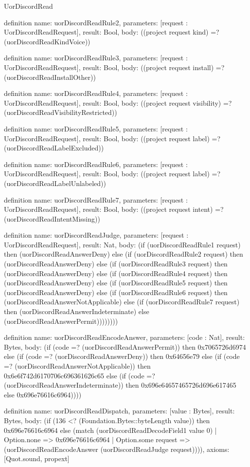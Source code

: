\begin{lexlean}{UorDiscordRead}
\begin{semanticmodule}
definition{
  name: uorDiscordReadRule2,
  parameters: [request : UorDiscordReadRequest],
  result: Bool,
  body: ((project request kind) =? (uorDiscordReadKindVoice))
}

definition{
  name: uorDiscordReadRule3,
  parameters: [request : UorDiscordReadRequest],
  result: Bool,
  body: ((project request install) =? (uorDiscordReadInstallOther))
}

definition{
  name: uorDiscordReadRule4,
  parameters: [request : UorDiscordReadRequest],
  result: Bool,
  body: ((project request visibility) =? (uorDiscordReadVisibilityRestricted))
}

definition{
  name: uorDiscordReadRule5,
  parameters: [request : UorDiscordReadRequest],
  result: Bool,
  body: ((project request label) =? (uorDiscordReadLabelExcluded))
}

definition{
  name: uorDiscordReadRule6,
  parameters: [request : UorDiscordReadRequest],
  result: Bool,
  body: ((project request label) =? (uorDiscordReadLabelUnlabeled))
}

definition{
  name: uorDiscordReadRule7,
  parameters: [request : UorDiscordReadRequest],
  result: Bool,
  body: ((project request intent) =? (uorDiscordReadIntentMissing))
}

definition{
  name: uorDiscordReadJudge,
  parameters: [request : UorDiscordReadRequest],
  result: Nat,
  body: (if (uorDiscordReadRule1 request) then (uorDiscordReadAnswerDeny) else (if (uorDiscordReadRule2 request) then (uorDiscordReadAnswerDeny) else (if (uorDiscordReadRule3 request) then (uorDiscordReadAnswerDeny) else (if (uorDiscordReadRule4 request) then (uorDiscordReadAnswerDeny) else (if (uorDiscordReadRule5 request) then (uorDiscordReadAnswerDeny) else (if (uorDiscordReadRule6 request) then (uorDiscordReadAnswerNotApplicable) else (if (uorDiscordReadRule7 request) then (uorDiscordReadAnswerIndeterminate) else (uorDiscordReadAnswerPermit))))))))
}

definition{
  name: uorDiscordReadEncodeAnswer,
  parameters: [code : Nat],
  result: Bytes,
  body: (if (code =? (uorDiscordReadAnswerPermit)) then 0x7065726d6974 else (if (code =? (uorDiscordReadAnswerDeny)) then 0x64656e79 else (if (code =? (uorDiscordReadAnswerNotApplicable)) then 0x6e6f742d6170706c696361626c65 else (if (code =? (uorDiscordReadAnswerIndeterminate)) then 0x696e64657465726d696e617465 else 0x696e76616c6964))))
}

definition{
  name: uorDiscordReadDispatch,
  parameters: [value : Bytes],
  result: Bytes,
  body: (if (136 <? (Foundation.Bytes::byteLength value)) then 0x696e76616c6964 else (match (uorDiscordReadDecodeField1 value 0)
    | Option.none => 0x696e76616c6964
    | Option.some request => (uorDiscordReadEncodeAnswer (uorDiscordReadJudge request)))),
  axioms: [Quot.sound, propext]
}
\end{semanticmodule}
\end{lexlean}

